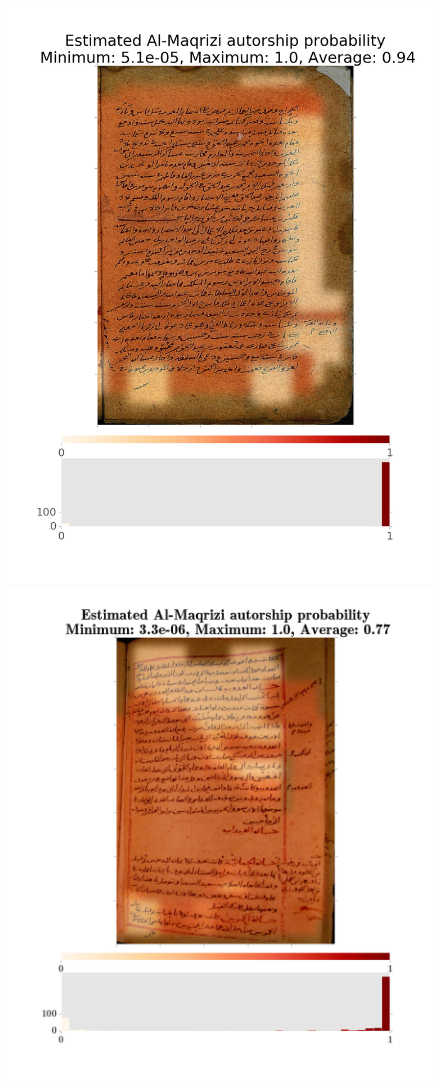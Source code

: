 \documentclass[conference,a4paper,twocolumn]{IEEEtran}
\begin{document}
\begin{figure}
\begin{minipage}{.48\linewidth}
  \includegraphics[width=0.8\linewidth]{figures/sw_al_maqrisi.png}
\end{minipage}
\hspace{.01\linewidth}
\begin{minipage}{.48\linewidth}
	\centering
  \includegraphics[width=\linewidth]{figures/hitat_15.png}

\end{minipage}
\end{figure}
\end{document}
